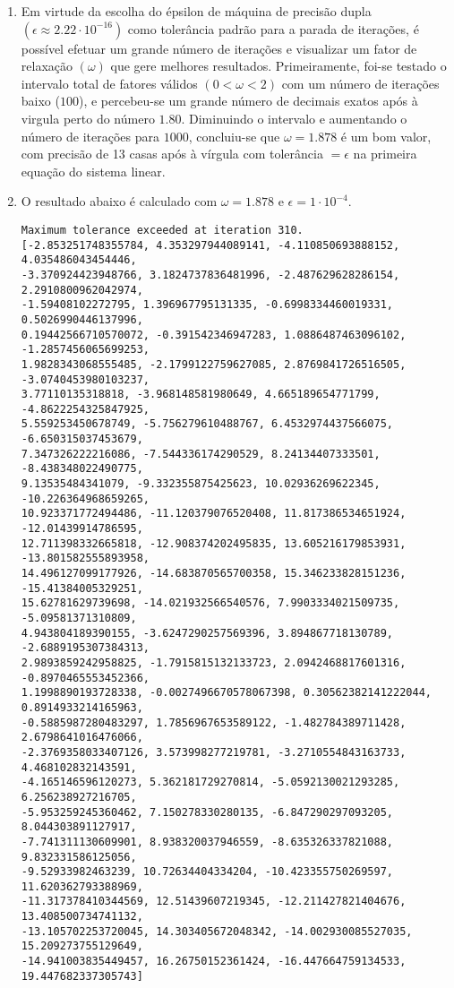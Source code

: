 \documentclass{article}
\newenvironment{arabenum}{
    \begin{enumerate}[label=\textbf{\arabic*})]
}{
    \end{enumerate}
}
\newenvironment{alphenum}{
    \begin{enumerate}[label=(\alph*)]
}{
    \end{enumerate}
}
\begin{document}
\begin{arabenum}
\begin{alphenum}
\item Em virtude da escolha do épsilon de máquina de precisão dupla
$(\epsilon \approx 2.22 \cdot 10^{-16})$ como tolerância padrão para a parada
de iterações, é possível efetuar um grande número de iterações e visualizar um
fator de relaxação $(\omega)$ que gere melhores resultados. Primeiramente,
foi-se testado o intervalo total de fatores válidos $(0 < \omega < 2)$ com um
número de iterações baixo ($100$), e percebeu-se um grande número de decimais
exatos após à virgula perto do número $\boldsymbol{1.80}$. Diminuindo o 
intervalo e aumentando o número de iterações para $1000$, concluiu-se que
$\omega = \boldsymbol{1.878}$ é um bom valor, com precisão de 13 casas após à
vírgula com tolerância $= \epsilon$ na primeira equação do sistema linear.

\item O resultado abaixo é calculado com $\omega = 1.878$ e
$\epsilon = 1 \cdot 10^{-4}$.

\begin{verbatim}
Maximum tolerance exceeded at iteration 310.
[-2.853251748355784, 4.353297944089141, -4.110850693888152, 4.035486043454446,
-3.370924423948766, 3.1824737836481996, -2.487629628286154, 2.2910800962042974,
-1.59408102272795, 1.396967795131335, -0.6998334460019331, 0.5026990446137996,
0.19442566710570072, -0.391542346947283, 1.0886487463096102, -1.2857456065699253,
1.9828343068555485, -2.1799122759627085, 2.8769841726516505, -3.0740453980103237,
3.77110135318818, -3.968148581980649, 4.665189654771799, -4.8622254325847925,
5.559253450678749, -5.756279610488767, 6.4532974437566075, -6.650315037453679,
7.347326222216086, -7.544336174290529, 8.24134407333501, -8.438348022490775,
9.13535484341079, -9.332355875425623, 10.02936269622345, -10.226364968659265,
10.923371772494486, -11.120379076520408, 11.817386534651924, -12.01439914786595,
12.711398332665818, -12.908374202495835, 13.605216179853931, -13.801582555893958,
14.496127099177926, -14.683870565700358, 15.346233828151236, -15.41384005329251,
15.62781629739698, -14.021932566540576, 7.9903334021509735, -5.09581371310809,
4.943804189390155, -3.6247290257569396, 3.894867718130789, -2.6889195307384313,
2.9893859242958825, -1.7915815132133723, 2.0942468817601316, -0.8970465553452366,
1.1998890193728338, -0.0027496670578067398, 0.30562382141222044, 0.8914933214165963,
-0.5885987280483297, 1.7856967653589122, -1.482784389711428, 2.6798641016476066,
-2.3769358033407126, 3.573998277219781, -3.2710554843163733, 4.468102832143591,
-4.165146596120273, 5.362181729270814, -5.0592130021293285, 6.256238927216705,
-5.953259245360462, 7.150278330280135, -6.847290297093205, 8.044303891127917,
-7.741311130609901, 8.938320037946559, -8.635326337821088, 9.832331586125056,
-9.52933982463239, 10.72634404334204, -10.423355750269597, 11.620362793388969,
-11.317378410344569, 12.51439607219345, -12.211427821404676, 13.408500734741132,
-13.105702253720045, 14.303405672048342, -14.002930085527035, 15.209273755129649,
-14.941003835449457, 16.26750152361424, -16.447664759134533, 19.447682337305743]
\end{verbatim}


\end{alphenum}
\end{arabenum}
\end{document}

